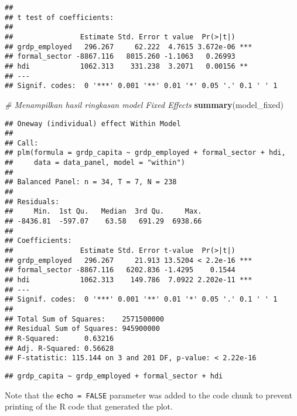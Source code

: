 \documentclass[
]{article}
\newenvironment{Shaded}{\begin{snugshade}}{\end{snugshade}}
\newcommand{\CommentTok}[1]{\textcolor[rgb]{0.56,0.35,0.01}{\textit{#1}}}
\newcommand{\FunctionTok}[1]{\textcolor[rgb]{0.13,0.29,0.53}{\textbf{#1}}}
\newcommand{\NormalTok}[1]{#1}
\newcommand{\SpecialCharTok}[1]{\textcolor[rgb]{0.81,0.36,0.00}{\textbf{#1}}}
\begin{document}
\begin{verbatim}
## 
## t test of coefficients:
## 
##                Estimate Std. Error t value  Pr(>|t|)    
## grdp_employed   296.267     62.222  4.7615 3.672e-06 ***
## formal_sector -8867.116   8015.260 -1.1063   0.26993    
## hdi            1062.313    331.238  3.2071   0.00156 ** 
## ---
## Signif. codes:  0 '***' 0.001 '**' 0.01 '*' 0.05 '.' 0.1 ' ' 1
\end{verbatim}

\begin{Shaded}
\begin{Highlighting}[]
\CommentTok{\# Menampilkan hasil ringkasan model Fixed Effects}
\FunctionTok{summary}\NormalTok{(model\_fixed)}
\end{Highlighting}
\end{Shaded}

\begin{verbatim}
## Oneway (individual) effect Within Model
## 
## Call:
## plm(formula = grdp_capita ~ grdp_employed + formal_sector + hdi, 
##     data = data_panel, model = "within")
## 
## Balanced Panel: n = 34, T = 7, N = 238
## 
## Residuals:
##     Min.  1st Qu.   Median  3rd Qu.     Max. 
## -8436.81  -597.07    63.58   691.29  6938.66 
## 
## Coefficients:
##                Estimate Std. Error t-value  Pr(>|t|)    
## grdp_employed   296.267     21.913 13.5204 < 2.2e-16 ***
## formal_sector -8867.116   6202.836 -1.4295    0.1544    
## hdi            1062.313    149.786  7.0922 2.202e-11 ***
## ---
## Signif. codes:  0 '***' 0.001 '**' 0.01 '*' 0.05 '.' 0.1 ' ' 1
## 
## Total Sum of Squares:    2571500000
## Residual Sum of Squares: 945900000
## R-Squared:      0.63216
## Adj. R-Squared: 0.56628
## F-statistic: 115.144 on 3 and 201 DF, p-value: < 2.22e-16
\end{verbatim}

\begin{Shaded}
\end{Shaded}

\begin{verbatim}
## grdp_capita ~ grdp_employed + formal_sector + hdi
\end{verbatim}

Note that the \texttt{echo\ =\ FALSE} parameter was added to the code
chunk to prevent printing of the R code that generated the plot.
\end{document}
